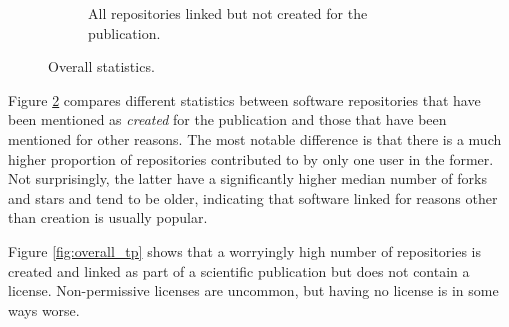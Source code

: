 \documentclass[10pt,a4paper]{scrartcl}
\begin{document}
\begin{figure}[h]
\begin{subfigure}[t]{0.8\textwidth}
        \caption{All repositories linked but not created for the publication.}
        \label{fig:overall_fp}
    \end{subfigure}
    \caption{Overall statistics.}
    \label{fig:overall_tfp}
\end{figure}

Figure \ref{fig:overall_tfp} compares different statistics between software repositories that have been mentioned as \textit{created} for the publication
and those that have been mentioned for other reasons.
The most notable difference is that there is a much higher proportion of repositories contributed to by only one user in the former.
Not surprisingly, the latter have a significantly higher median number of forks and stars and tend to be older,
indicating that software linked for reasons other than creation is usually popular.

Figure \ref{fig:overall_tp} shows that a worryingly high number of repositories is created and linked as part of a scientific publication
but does not contain a license.
Non-permissive licenses are uncommon, but having no license is in some ways worse.
\end{document}
